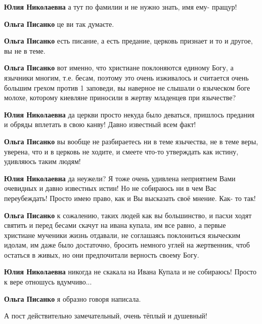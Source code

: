 \begin{itemize}
\begin{itemize}
\begin{itemize}
\textbf{Юлия Николаевна} а тут по фамилии и не нужно знать, имя ему- пращур!

\textbf{Ольга Писанко} це ви так думаєте.
\end{itemize} %

\textbf{Ольга Писанко} есть писание, а есть предание, церковь признает и то и другое, вы не в теме.

\textbf{Ольга Писанко} вот именно, что христиане поклоняются единому Богу, а язычники многим, т.е. бесам, поэтому это очень изживалось и считается очень большим грехом против 1 заповеди, вы наверное не слышали о языческом боге молохе, которому киевляне приносили в жертву младенцев при язычестве?

\begin{itemize} %
\textbf{Юлия Николаевна} да церкви просто некуда было деваться, пришлось предания и обряды вплетать в свою канву! Давно известный всем факт!

\textbf{Ольга Писанко} вы вообще не разбираетесь ни в теме язычества, не в теме веры, уверена, что и в церковь не ходите, и смеете что-то утверждать как истину, удивляюсь таким людям!

\textbf{Юлия Николаевна} да неужели? Я тоже очень удивлена неприятием Вами очевидных и давно известных истин! Но не собираюсь ни в чем Вас переубеждать! Просто имею право, как и Вы высказать своё мнение. Как- то так!

\textbf{Ольга Писанко} к сожалению, таких людей как вы большинство, и пасхи ходят святить и перед бесами скачут на ивана купала, им все равно, а первые христиане мученики жизнь отдавали, не соглашаясь поклониться языческим идолам, им даже было достаточно, бросить немного углей на жертвенник, чтоб остаться в живых, но они предпочитали верность своему Богу.

\textbf{Юлия Николаевна} никогда не скакала на Ивана Купала и не собираюсь! Просто к вере отношусь вдумчиво...

\textbf{Ольга Писанко} я образно говоря написала.

\end{itemize} %

\end{itemize} %


А пост действительно замечательный, очень тёплый и душевный!


\end{itemize}

